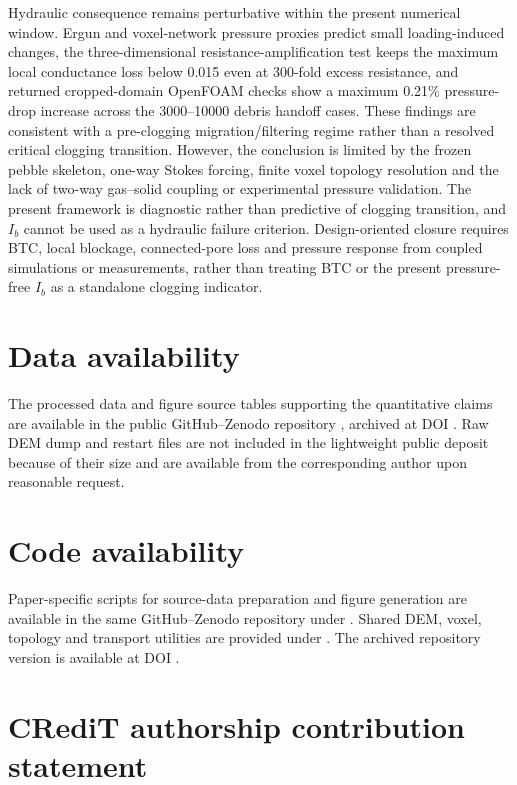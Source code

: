 \documentclass[preprint,12pt,authoryear]{elsarticle}
\newcommand{\BTC}{BTC\xspace}
\newcommand{\Ib}{$I_b$\xspace}
\begin{document}
Hydraulic consequence remains perturbative within the present numerical window. Ergun and voxel-network pressure proxies predict small loading-induced changes, the three-dimensional resistance-amplification test keeps the maximum local conductance loss below 0.015 even at 300-fold excess resistance, and returned cropped-domain OpenFOAM checks show a maximum 0.21\% pressure-drop increase across the 3000--10000 debris handoff cases. These findings are consistent with a pre-clogging migration/filtering regime rather than a resolved critical clogging transition. However, the conclusion is limited by the frozen pebble skeleton, one-way Stokes forcing, finite voxel topology resolution and the lack of two-way gas--solid coupling or experimental pressure validation. The present framework is diagnostic rather than predictive of clogging transition, and \Ib cannot be used as a hydraulic failure criterion. Design-oriented closure requires \BTC, local blockage, connected-pore loss and pressure response from coupled simulations or measurements, rather than treating \BTC or the present pressure-free \Ib as a standalone clogging indicator.

\section*{Data availability}

The processed data and figure source tables supporting the quantitative claims are available in the public GitHub--Zenodo repository , archived at DOI . Raw DEM dump and restart files are not included in the lightweight public deposit because of their size and are available from the corresponding author upon reasonable request.

\section*{Code availability}

Paper-specific scripts for source-data preparation and figure generation are available in the same GitHub--Zenodo repository under . Shared DEM, voxel, topology and transport utilities are provided under . The archived repository version is available at DOI .

\section*{CRediT authorship contribution statement}
\end{document}
